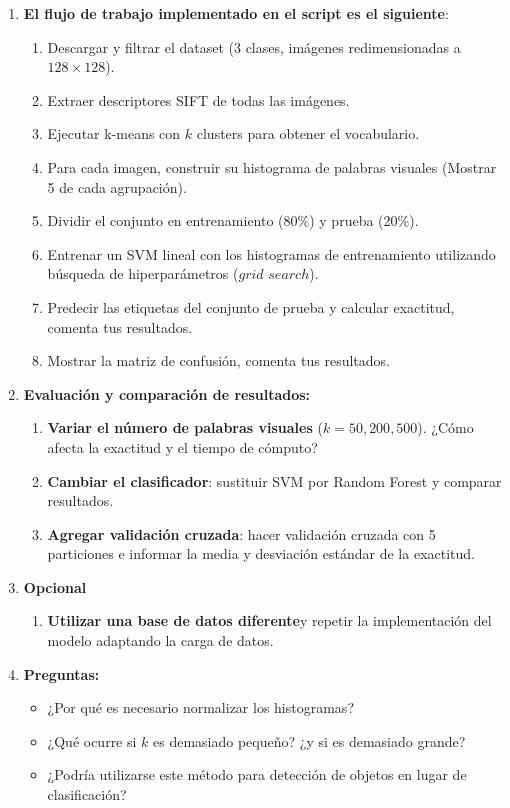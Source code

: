 \documentclass{article}
\begin{document}
\begin{enumerate}
\item \textbf{El flujo de trabajo implementado en el script es el siguiente}:
    \begin{enumerate}
        \item Descargar y filtrar el dataset (3 clases, imágenes redimensionadas a $128\times128$).
        \item Extraer descriptores SIFT de todas las imágenes.
        \item Ejecutar k-means con $k$ clusters para obtener el vocabulario.
        \item Para cada imagen, construir su histograma de palabras visuales (Mostrar 5 de cada agrupación).
        \item Dividir el conjunto en entrenamiento (80\%) y prueba (20\%).
        \item Entrenar un SVM lineal con los histogramas de entrenamiento utilizando búsqueda de hiperparámetros ($grid$ $search$).
        \item Predecir las etiquetas del conjunto de prueba y calcular exactitud, comenta tus resultados.
        \item Mostrar la matriz de confusión, comenta tus resultados.
    \end{enumerate}

  
\item \textbf{Evaluación y comparación de resultados: }
    \begin{enumerate}
        \item \textbf{Variar el número de palabras visuales} ($k = 50, 200, 500$). ¿Cómo afecta la exactitud y el tiempo de cómputo?
        \item \textbf{Cambiar el clasificador}: sustituir SVM por Random Forest  y comparar resultados.
        \item \textbf{Agregar validación cruzada}: hacer validación cruzada con 5 particiones e informar la media y desviación estándar de la exactitud.

    \end{enumerate}

\item \textbf{Opcional}
    \begin{enumerate}
        \item \textbf{Utilizar una base de datos diferente}y repetir la implementación del modelo adaptando la carga de datos.      
    \end{enumerate}

\item \textbf{Preguntas:}

    \begin{itemize}
        \item ¿Por qué es necesario normalizar los histogramas?
        \item ¿Qué ocurre si $k$ es demasiado pequeño? ¿y si es demasiado grande?
        \item ¿Podría utilizarse este método para detección de objetos en lugar de clasificación?
    \end{itemize}

\end{enumerate}
\end{document}
